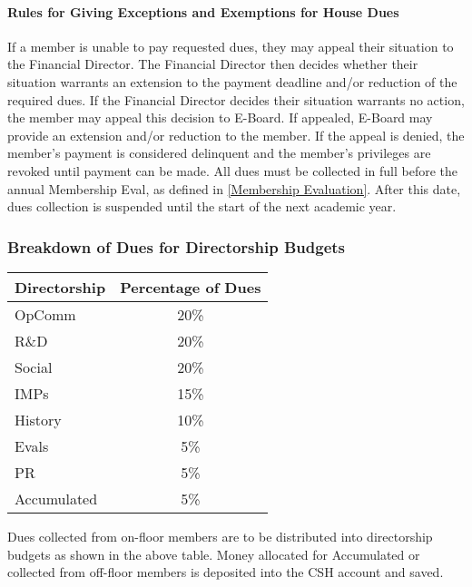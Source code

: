 \documentclass{article}
\newcommand{\asubsection}[1]{\subsubsection{#1} \label{#1}}
\newcommand{\asubsubsection}[1]{\paragraph{#1} \label{#1}}
\begin{document}
\asubsubsection{Rules for Giving Exceptions and Exemptions for House Dues}
If a member is unable to pay requested dues, they may appeal their situation to the Financial Director.
The Financial Director then decides whether their situation warrants an extension to the payment deadline and/or reduction of the required dues.
If the Financial Director decides their situation warrants no action, the member may appeal this decision to E-Board.
If appealed, E-Board may provide an extension and/or reduction to the member.
If the appeal is denied, the member’s payment is considered delinquent and the member’s privileges are revoked until payment can be made.
All dues must be collected in full before the annual Membership Eval, as defined in \ref{Membership Evaluation}.
After this date, dues collection is suspended until the start of the next academic year.
\asubsection{Breakdown of Dues for Directorship Budgets}
\begin{center}
	\begin{tabular}[c]{|l c|}
		\hline
		Directorship & Percentage of Dues
		\\ \hline
		\hline
		OpComm       & 20\%
		\\ \hline
		R\&D         & 20\%
		\\ \hline
		Social       & 20\%
		\\ \hline
		IMPs         & 15\%
		\\ \hline
		History      & 10\%
		\\ \hline
		Evals        & 5\%
		\\ \hline
		PR           & 5\%
		\\ \hline
		Accumulated  & 5\%
		\\ \hline
	\end{tabular}
\end{center}

Dues collected from on-floor members are to be distributed into directorship budgets as shown in the above table.
Money allocated for Accumulated or collected from off-floor members is deposited into the CSH account and saved.
\end{document}
